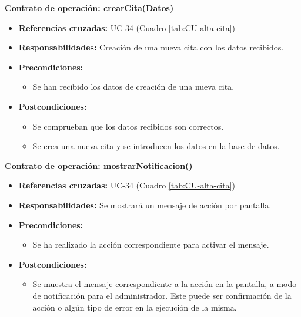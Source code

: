 \textbf{Contrato de operación: crearCita(Datos)}
\begin{itemize}
\item \textbf{Referencias cruzadas:} UC-34 (Cuadro \ref{tab:CU-alta-cita})
\item \textbf{Responsabilidades:} Creación de una nueva cita con los datos recibidos.
\item \textbf{Precondiciones:} 
 \begin{itemize}
\item Se han recibido los datos de creación de una nueva cita.
\end {itemize}
\item \textbf{Postcondiciones:} 
 \begin{itemize}
 \item Se comprueban que los datos recibidos son correctos.
\item Se crea una nueva cita y se introducen los datos en la base de datos.
\end {itemize}
\end {itemize}

\textbf{Contrato de operación: mostrarNotificacion()}
\begin{itemize}
\item \textbf{Referencias cruzadas:} UC-34 (Cuadro \ref{tab:CU-alta-cita})
\item \textbf{Responsabilidades:} Se mostrará un mensaje de acción por pantalla.
\item \textbf{Precondiciones:} 
 \begin{itemize}
\item Se ha realizado la acción correspondiente para activar el mensaje.
\end {itemize}
\item \textbf{Postcondiciones:} 
 \begin{itemize}
\item Se muestra el mensaje correspondiente a la acción en la pantalla, a modo de notificación para el administrador. Este puede ser confirmación de la acción o algún tipo de error en la ejecución de la misma.
\end {itemize}
\end {itemize}


\vspace{7mm}
\dotfill
\vspace{7mm}

